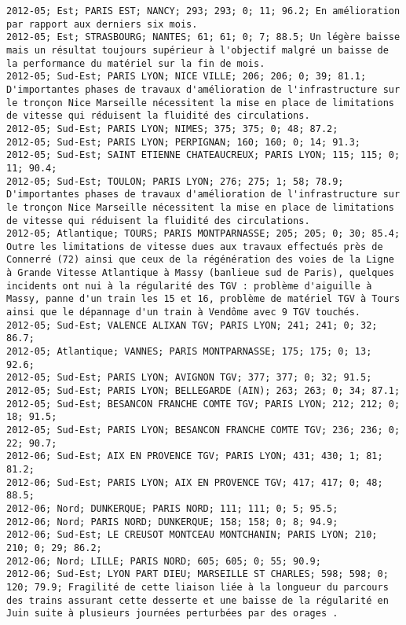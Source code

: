 \documentclass{article}
\begin{document}
\begin{Verbatim}[commandchars=\\\{\}]
2012-05; Est; PARIS EST; NANCY; 293; 293; 0; 11; 96.2; En amélioration par rapport aux derniers six mois.
2012-05; Est; STRASBOURG; NANTES; 61; 61; 0; 7; 88.5; Un légère baisse mais un résultat toujours supérieur à l'objectif malgré un baisse de la performance du matériel sur la fin de mois.
2012-05; Sud-Est; PARIS LYON; NICE VILLE; 206; 206; 0; 39; 81.1; D'importantes phases de travaux d'amélioration de l'infrastructure sur le tronçon Nice Marseille nécessitent la mise en place de limitations de vitesse qui réduisent la fluidité des circulations.
2012-05; Sud-Est; PARIS LYON; NIMES; 375; 375; 0; 48; 87.2; 
2012-05; Sud-Est; PARIS LYON; PERPIGNAN; 160; 160; 0; 14; 91.3; 
2012-05; Sud-Est; SAINT ETIENNE CHATEAUCREUX; PARIS LYON; 115; 115; 0; 11; 90.4; 
2012-05; Sud-Est; TOULON; PARIS LYON; 276; 275; 1; 58; 78.9; D'importantes phases de travaux d'amélioration de l'infrastructure sur le tronçon Nice Marseille nécessitent la mise en place de limitations de vitesse qui réduisent la fluidité des circulations.
2012-05; Atlantique; TOURS; PARIS MONTPARNASSE; 205; 205; 0; 30; 85.4; Outre les limitations de vitesse dues aux travaux effectués près de Connerré (72) ainsi que ceux de la régénération des voies de la Ligne à Grande Vitesse Atlantique à Massy (banlieue sud de Paris), quelques incidents ont nui à la régularité des TGV : problème d'aiguille à Massy, panne d'un train les 15 et 16, problème de matériel TGV à Tours ainsi que le dépannage d'un train à Vendôme avec 9 TGV touchés.
2012-05; Sud-Est; VALENCE ALIXAN TGV; PARIS LYON; 241; 241; 0; 32; 86.7; 
2012-05; Atlantique; VANNES; PARIS MONTPARNASSE; 175; 175; 0; 13; 92.6; 
2012-05; Sud-Est; PARIS LYON; AVIGNON TGV; 377; 377; 0; 32; 91.5; 
2012-05; Sud-Est; PARIS LYON; BELLEGARDE (AIN); 263; 263; 0; 34; 87.1; 
2012-05; Sud-Est; BESANCON FRANCHE COMTE TGV; PARIS LYON; 212; 212; 0; 18; 91.5; 
2012-05; Sud-Est; PARIS LYON; BESANCON FRANCHE COMTE TGV; 236; 236; 0; 22; 90.7; 
2012-06; Sud-Est; AIX EN PROVENCE TGV; PARIS LYON; 431; 430; 1; 81; 81.2; 
2012-06; Sud-Est; PARIS LYON; AIX EN PROVENCE TGV; 417; 417; 0; 48; 88.5; 
2012-06; Nord; DUNKERQUE; PARIS NORD; 111; 111; 0; 5; 95.5; 
2012-06; Nord; PARIS NORD; DUNKERQUE; 158; 158; 0; 8; 94.9; 
2012-06; Sud-Est; LE CREUSOT MONTCEAU MONTCHANIN; PARIS LYON; 210; 210; 0; 29; 86.2; 
2012-06; Nord; LILLE; PARIS NORD; 605; 605; 0; 55; 90.9; 
2012-06; Sud-Est; LYON PART DIEU; MARSEILLE ST CHARLES; 598; 598; 0; 120; 79.9; Fragilité de cette liaison liée à la longueur du parcours des trains assurant cette desserte et une baisse de la régularité en Juin suite à plusieurs journées perturbées par des orages .

\end{Verbatim}
\end{document}
